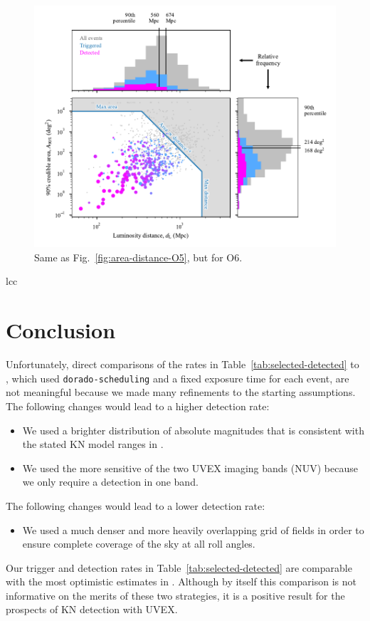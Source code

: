 \documentclass[twocolumn,times]{aastex631}
\begin{document}
\begin{figure}
    \centering
    \includegraphics{figures/area-distance-O6}
    \caption{\label{fig:area-distance-O6}Same as Fig.~\ref{fig:area-distance-O5}, but for O6.}
\end{figure}

\begin{deluxetable}{lcc}
    \startdata
    
    \enddata
\end{deluxetable}

\section{Conclusion}

Unfortunately, direct comparisons of the rates in Table~\ref{tab:selected-detected} to \citet{2025arXiv250114109C}, which used \texttt{dorado-scheduling} and a fixed exposure time for each event, are not meaningful because we made many refinements to the starting assumptions. The following changes would lead to a higher detection rate:
%
\begin{itemize}
    \item We used a brighter distribution of absolute magnitudes that is consistent with the stated \ac{KN} model ranges in \citet{2021arXiv211115608K}.
    \item We used the more sensitive of the two \ac{UVEX} imaging bands (\ac{NUV}) because we only require a detection in one band.
\end{itemize}
%
The following changes would lead to a lower detection rate:
%
\begin{itemize}
    \item We used a much denser and more heavily overlapping grid of fields in order to ensure complete coverage of the sky at all roll angles.
\end{itemize}
%
Our trigger and detection rates in Table~\ref{tab:selected-detected} are comparable with the most optimistic estimates in \citet{2025arXiv250114109C}. Although by itself this comparison is not informative on the merits of these two strategies, it is a positive result for the prospects of \ac{KN} detection with \ac{UVEX}.
\end{document}
